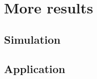 \section{More results} %
\label{sec:more_results}

\subsection{Simulation} %
\label{sub:simulation}


\subsection{Application} %
\label{sub:application}

